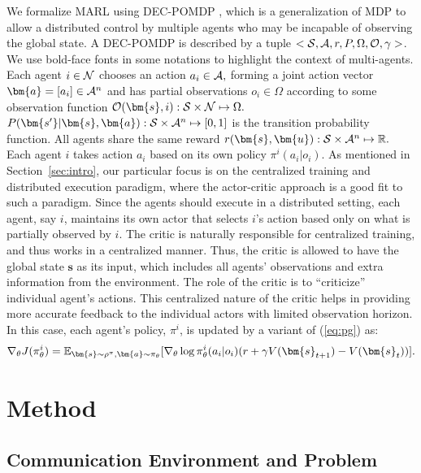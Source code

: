 \documentclass{article} %
\begin{document}
We formalize MARL using DEC-POMDP \citep{oliehoek2016concise},
which is a generalization of MDP to allow a distributed control by
multiple agents who may be incapable of observing the global state. A
DEC-POMDP is described by a tuple
$<{\cal S}, {\cal A}, r, P, \Omega, {\cal O}, \gamma>$. We use bold-face fonts in some notations to highlight the context of multi-agents. Each agent
$i \in \mathcal N $ chooses an action $a_i \in {\cal A},$ forming a joint action vector $\bm{a} = [a_i] \in \cA^n$  and has partial observations $o_i \in \Omega$ according to some
observation function
$\cO(\bm{s},i) : \cS \times \set{N} \mapsto \Omega.$ 
$P(\bm{s'}|\bm{s},\bm{a}): \cS \times \cA^n \mapsto [0,1]$ is the transition probability function. All agents share the same reward $r(\bm{s},\bm{u}): \cS \times \cA^n \mapsto \real.$
Each agent $i$
takes action $a_i$ based on its own policy $\pi^i(a_i|o_i)$.
As mentioned in Section~\ref{sec:intro}, our particular focus is on 
the centralized training and distributed
execution paradigm, where the actor-critic approach is a good fit to such a paradigm. Since the agents should execute in a distributed setting, 
each agent, say $i$, maintains its own actor that selects $i$'s action based only on what is partially observed by $i.$
The critic is naturally responsible for centralized training, and thus works in a centralized manner. Thus, the critic is allowed to have the global state
${\bm s}$ as its input, which includes all agents' observations and extra
information from the environment. The role of the critic is to ``criticize''
individual agent's actions. 
This centralized nature of the critic helps in 
providing more accurate feedback to the individual actors with
limited observation horizon.
In this case, each agent's policy, $\pi^i$, is updated by a variant of 
(\ref{eq:pg}) as:
\begin{align}
  \label{eq:mapg}
\grad_{\theta} J(\pi^i_{\theta}) = 
 \mathbb{E}_{\bm{s}\sim \rho^\pi,\bm{a}\sim
   \pi_{\theta}}[\grad_{\theta} \log \pi^i_\theta(a_i|o_i)(r+\gamma V(\bm{s}_{t+1})-V(\bm{s}_t))].
\end{align}


% 
\section{Method}

\subsection{Communication Environment and Problem}
\label{sec:comm-env}
\end{document}
